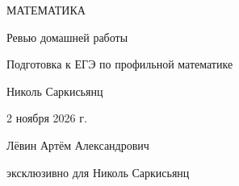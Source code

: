 \documentclass[a4paper,11pt]{article}
\begin{document}
\thispagestyle{empty}
\begin{center}
\vspace*{31mm}
{\large\color{accent} МАТЕМАТИКА}\par
\vspace{21mm}
{\Huge Ревью домашней работы}\par
\vspace{14mm}
{\Large\color{accent} Подготовка к ЕГЭ по профильной математике}\par
\vspace{22mm}
{\large Николь Саркисьянц}\par
\vspace{17mm}
{\large 2 ноября 2026 г.}\par
\vfill
{\small Лёвин Артём Александрович}\par
\smallskip
{\small эксклюзивно для Николь Саркисьянц}\par
\vspace{12mm}
\end{center}
\clearpage
\end{document}
